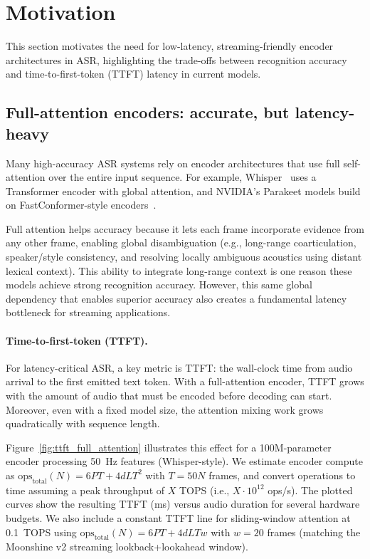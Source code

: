 

\section{Motivation}
\label{sec:motivation}
This section motivates the need for low-latency, streaming-friendly encoder
architectures in ASR, highlighting the trade-offs between recognition accuracy
and time-to-first-token (TTFT) latency in current models.

\subsection{Full-attention encoders: accurate, but latency-heavy}
Many high-accuracy ASR systems rely on encoder architectures that use full
self-attention over the entire input sequence. For example,
Whisper~\citep{radford2022robustspeechrecognitionlargescale} uses a Transformer
encoder with global attention, and NVIDIA's Parakeet models build on
FastConformer-style encoders~\citep{rekesh2023fastconformer}.

Full attention helps accuracy because it lets each frame incorporate evidence
from any other frame, enabling global disambiguation (e.g., long-range
coarticulation, speaker/style consistency, and resolving locally ambiguous
acoustics using distant lexical context). This ability to integrate long-range
context is one reason these models achieve strong recognition accuracy. However,
this same global dependency that enables superior accuracy also creates a
fundamental latency bottleneck for streaming applications.

\paragraph{Time-to-first-token (TTFT).}
For latency-critical ASR, a key metric is TTFT: the wall-clock time from audio
arrival to the first emitted text token. With a full-attention encoder, TTFT
grows with the amount of audio that must be encoded before decoding can start.
Moreover, even with a fixed model size, the attention mixing work grows
quadratically with sequence length.

Figure~\ref{fig:ttft_full_attention} illustrates this effect for a
100M-parameter encoder processing 50~Hz features (Whisper-style). We estimate
encoder compute as $\mathrm{ops}_{\mathrm{total}}(N) = 6PT + 4dLT^2$ with
$T=50N$ frames, and convert operations to time assuming a peak throughput of $X$
TOPS (i.e., $X\cdot10^{12}$ ops/s). The plotted curves show the resulting TTFT
(ms) versus audio duration for several hardware budgets. We also include a
constant TTFT line for sliding-window attention at 0.1~TOPS using
$\mathrm{ops}_{\mathrm{total}}(N) = 6PT + 4dLTw$ with $w=20$ frames (matching the
Moonshine v2 streaming lookback+lookahead window).

